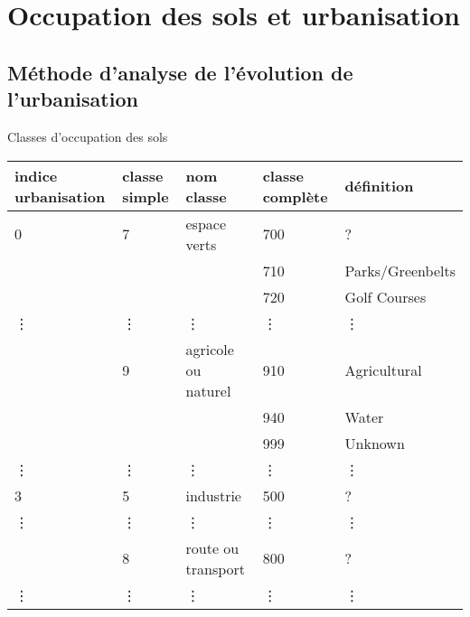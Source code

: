 \documentclass[aspectratio=169]{beamer}
\begin{document}
\section{Occupation des sols et urbanisation}

\subsection{Méthode d\rq{}analyse de l\rq{}évolution de l\rq{}urbanisation}

\begin{frame}{Classes d\rq{}occupation des sols}
\begin{table}[ht]
\centering
\scriptsize
\begin{tabularx}{\textwidth}{lllll}
  \toprule
indice urbanisation & classe simple & nom classe & classe complète & définition \\ 
  \midrule
  0 &   7 & espace verts & 700 & ? \\ 
     &    &  & 710 & Parks/Greenbelts  \\ 
     &    &  & 720 & Golf Courses  \\ 
\vdots &  \vdots & \vdots & \vdots & \vdots \\
     &   9 & agricole ou naturel & 910 & Agricultural \\ 
     &    &  & 940 & Water  \\ 
     &    &  & 999 & Unknown \\ 
     \midrule
\vdots &  \vdots & \vdots & \vdots & \vdots \\
     \midrule
    3 &   5 & industrie & 500 & ? \\ 
\vdots &  \vdots & \vdots & \vdots & \vdots \\
     &   8 & route ou transport & 800 & ? \\ 
\vdots &  \vdots & \vdots & \vdots & \vdots \\
   \bottomrule
\end{tabularx}
\end{table}
\end{frame}
\end{document}
